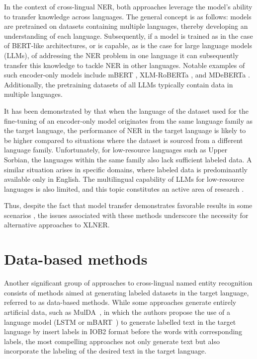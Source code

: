 In the context of cross-lingual NER, both approaches leverage the model's ability to transfer knowledge
across languages. The general concept is as follows: models are pretrained on datasets containing
multiple languages, thereby developing an understanding of each language. Subsequently, if a model
is trained as in the case of BERT-like architectures, or is capable, as is the case for large language models (LLMs),
of addressing the NER problem in one language it can subsequently transfer this knowledge to tackle
NER in other languages. Notable examples of such encoder-only models include mBERT
\cite{devlin-etal-2019-bert}, XLM-RoBERTa \cite{conneau-etal-2020-unsupervised-xlmr}, and
MDeBERTa \cite{He2020DeBERTaDB,He2021DeBERTaV3ID}. Additionally, the pretraining datasets
of all LLMs typically contain data in multiple languages.

It has been demonstrated by \cite{torge-etal-2023-named} that when the language of the dataset used for the
fine-tuning of an encoder-only model originates from the same language family as the target
language, the performance of NER in the target language is likely to be higher compared to situations
where the dataset is sourced from a different language family. Unfortunately, for low-resource
languages such as Upper Sorbian, the languages within the same family also lack sufficient labeled data.
A similar situation arises in specific domains, where labeled data is predominantly available only in English.
The multilingual capability of LLMs for low-resource languages is also limited,
and this topic constitutes an active area of research \cite{lai-etal-2024-llms}.

Thus, despite the fact that model transfer demonstrates favorable results in some
scenarios \cite{garcia-ferrero-etal-2022-model}, the issues associated with these methods
underscore the necessity for alternative approaches to XLNER.

\section{Data-based methods}

Another significant group of approaches to cross-lingual named entity recognition consists of methods
aimed at generating labeled datasets in the target language, referred to as data-based methods.
While some approaches generate entirely artificial data, such as MulDA~\cite{liu-etal-2021-mulda},
in which the authors propose the use of a language model (LSTM \cite{lstm} or
mBART~\cite{liu-etal-2020-multilingual-denoising}) to generate labelled text in the target language by
insert labels in IOB2 format before the words with corresponding labels, the most compelling approaches
not only generate text but also incorporate the labeling of the desired text in the target language.

